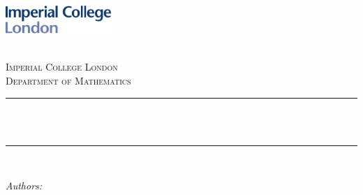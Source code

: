 \begin{titlepage}

    \newcommand{\HRule}{\rule{\linewidth}{0.5mm}} %



    \includegraphics[width = 4cm]{./figures/imperial}\\[0.5cm]

    \begin{center} %

        \textsc{\LARGE \reporttype}\\[1.5cm]
        \textsc{\Large Imperial College London}\\[0.5cm]
        \textsc{\large Department of Mathematics}\\[0.5cm]

        \HRule \\[0.4cm]
        { \huge \bfseries \reporttitle}\\ %
        \HRule \\[1.5cm]
    \end{center}

    \begin{flushleft}
        \large
        \textit{Authors:}\\
        \reportauthor~ %
    \end{flushleft}
    \vspace{2cm}
    \makeatletter

    \vfill %



    \makeatother


\end{titlepage}

